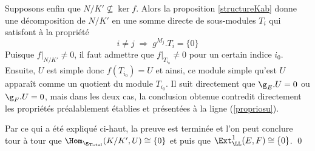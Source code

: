 \begin{Prop}
\begin{pre}
Supposons enfin que $N/K' \nsubseteq \ker f$. Alors la proposition \ref{structureKab} donne une décomposition de $N/K'$ en une somme directe de sous-modules $T_i$ qui satisfont à la propriété 
$$ i \neq j \; \Rightarrow \; g^{M_j}.T_i = \{0\} $$ 
Puisque $f|_{N/K'} \neq 0$, il faut admettre que $f|_{T_{i_0}} \neq 0$ pour un certain indice $i_0$. Ensuite, $U$ est simple donc $f(T_{i_0}) = U$ et ainsi, ce module simple qu'est $U$ apparaît comme un quotient du module $T_{i_0}$. Il suit directement que $\g_E.U = 0$ ou $\g_F.U = 0$, mais dans les deux cas, la conclusion obtenue contredit directement les propriétés préalablement établies et présentées à la ligne (\ref{propriosu}). 

Par ce qui a été expliqué ci-haut, la preuve est terminée et l'on peut conclure tour à tour que $\Hom_{\g_\text{Total}}(K/K',U) \cong \{0\}$ et puis que $\Ext_\LL^1(E,F) \cong \{0\}$. \qed
\end{pre}
\end{Prop}

